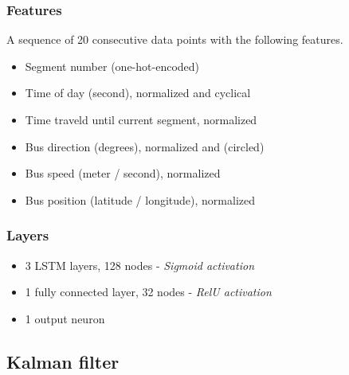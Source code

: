 \subsubsection{Features}
A sequence of 20 consecutive data points with the following features. 
\begin{itemize}
    \item Segment number (one-hot-encoded)
    \item Time of day (second), normalized and cyclical
    \item Time traveld until current segment, normalized
    \item Bus direction (degrees), normalized and (circled)
    \item Bus speed (meter / second), normalized
    \item Bus position (latitude / longitude), normalized
\end{itemize}

\subsubsection{Layers}

\begin{itemize}
    \item 3 LSTM layers, 128 nodes - \textit{Sigmoid activation}
    \item 1 fully connected layer, 32 nodes - \textit{RelU activation}
    \item 1 output neuron
\end{itemize}


\subsection{Kalman filter}




